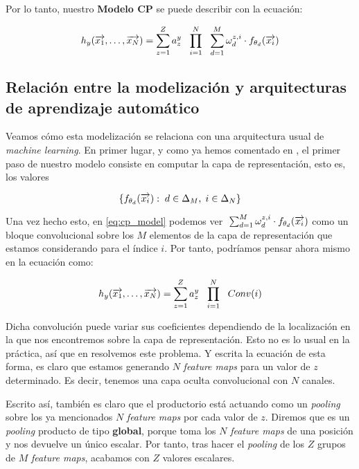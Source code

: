 Por lo tanto, nuestro \textbf{Modelo CP} se puede describir con la ecuación:

\begin{equation} \label{eq:cp_model}
    h_y(\overrightarrow{x_1}, \ldots, \overrightarrow{x_N}) =  \sum_{z = 1}^Z a_z^y \ \  \prod_{i = 1}^N \ \  \sum_{d = 1}^{M} \omega^{z, i}_d \cdot f_{\theta_{d}}(\overrightarrow{x_i})
\end{equation}

\subsection{Relación entre la modelización y arquitecturas de aprendizaje automático}

Veamos cómo esta modelización se relaciona con una arquitectura usual de \textit{machine learning}. En primer lugar, y como ya hemos comentado en , el primer paso de nuestro modelo consiste en computar la capa de representación, esto es, los valores

\begin{equation}
    \{f_{\theta_d}(\overrightarrow{x_i}) : \; d \in \Delta_{M}, \; i \in \Delta_{N} \}
\end{equation}

Una vez hecho esto, en \eqref{eq:cp_model} podemos ver $\; \sum_{d = 1}^{M} \omega^{z, i}_d \cdot f_{\theta_{d}}(\overrightarrow{x_i})$ como un bloque convolucional sobre los $M$ elementos de la capa de representación que estamos considerando para el índice $i$. Por tanto, podríamos pensar ahora mismo en la ecuación como:

\begin{equation}
    h_y(\overrightarrow{x_1}, \ldots, \overrightarrow{x_N}) =  \sum_{z = 1}^Z a_z^y \ \  \prod_{i = 1}^N \ \  Conv(i)
\end{equation}

Dicha convolución puede variar sus coeficientes dependiendo de la localización en la que nos encontremos sobre la capa de representación. Esto no es lo usual en la práctica, así que en  resolvemos este problema. Y escrita la ecuación de esta forma, es claro que estamos generando $N$ \textit{feature maps} para un valor de $z$ determinado. Es decir, tenemos una capa oculta convolucional con $N$ canales.

Escrito así, también es claro que el productorio está actuando como un \textit{pooling} sobre los ya mencionados $N$ \textit{feature maps} por cada valor de $z$. Diremos que es un \textit{pooling} producto de tipo \textbf{global}, porque toma los $N$ \textit{feature maps} de una posición y nos devuelve un único escalar. Por tanto, tras hacer el \textit{pooling} de los $Z$ grupos de $M$ \textit{feature maps}, acabamos con $Z$ valores escalares.

